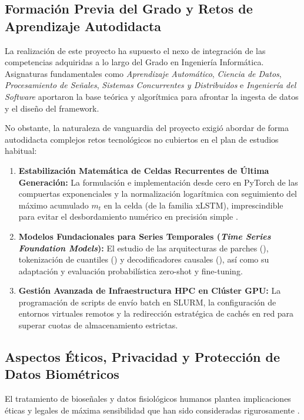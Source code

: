 \subsection{Formación Previa del Grado y Retos de Aprendizaje Autodidacta}

La realización de este proyecto ha supuesto el nexo de integración de las competencias adquiridas a lo largo del Grado en Ingeniería Informática. Asignaturas fundamentales como \textit{Aprendizaje Automático}, \textit{Ciencia de Datos}, \textit{Procesamiento de Señales}, \textit{Sistemas Concurrentes y Distribuidos} e \textit{Ingeniería del Software} aportaron la base teórica y algorítmica para afrontar la ingesta de datos y el diseño del framework.

No obstante, la naturaleza de vanguardia del proyecto exigió abordar de forma autodidacta complejos retos tecnológicos no cubiertos en el plan de estudios habitual:
\begin{enumerate}
    \item \textbf{Estabilización Matemática de Celdas Recurrentes de Última Generación:} La formulación e implementación desde cero en PyTorch de las compuertas exponenciales y la normalización logarítmica con seguimiento del máximo acumulado $m_t$ en la celda \slstm{} (de la familia xLSTM), imprescindible para evitar el desbordamiento numérico en precisión simple .
    \item \textbf{Modelos Fundacionales para Series Temporales (\textit{Time Series Foundation Models}):} El estudio de las arquitecturas de parches (\moment{}), tokenización de cuantiles (\chronos{}) y decodificadores causales (\timesfm{}), así como su adaptación y evaluación probabilística zero-shot y fine-tuning.
    \item \textbf{Gestión Avanzada de Infraestructura HPC en Clúster GPU:} La programación de scripts de envío batch en SLURM, la configuración de entornos virtuales remotos y la redirección estratégica de cachés en red para superar cuotas de almacenamiento estrictas.
\end{enumerate}

\subsection{Aspectos Éticos, Privacidad y Protección de Datos Biométricos}
\label{sec:concl_etica}

El tratamiento de bioseñales y datos fisiológicos humanos plantea implicaciones éticas y legales de máxima sensibilidad que han sido consideradas rigurosamente \cite{boucsein2012electrodermal, guillen2025libro}.

